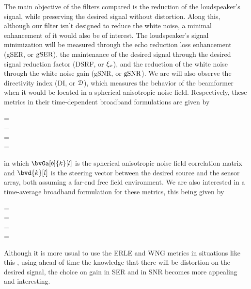 The main objective of the filters compared is the reduction of the loudspeaker's signal, while preserving the desired signal without distortion. Along this, although our filter isn't designed to reduce the white noise, a minimal enhancement of it would also be of interest. The loudspeaker's signal minimization will be measured through the echo reduction loss enhancement (gSER, or $\text{gSER}$), the maintenance of the desired signal through the desired signal reduction factor (DSRF, or $\xi_{x}$), and the reduction of the white noise through the white noise gain (gSNR, or $\text{gSNR}$). We are will also observe the directivity index (DI, or $\mathcal{D}$), which measures the behavior of the beamformer when it would be located in a spherical anisotropic noise field. Respectively, these metrics in their time-dependent broadband formulations are given by
\begin{subgather}
	\dsrf[l] =  \\
	\gser[l] =  \cdot {}\\
	\gsnr[l] =  \cdot {} \\
	\di[l] = 
\end{subgather}
in which $\bvGa[b]{k}[l]$ is the spherical anisotropic noise field correlation matrix \cite{habets_generating_2007} and $\bvd{k}[l]$ is the steering vector between the desired source and the sensor array, both assuming a far-end free field environment. We are also interested in a time-average broadband formulation for these metrics, this being given by
\begin{subgather}
	\dsrf =  \\
	\gser =  \cdot {} \\
	\gsnr =  \cdot {} \\
	\di = 
\end{subgather}

Although it is more usual to use the ERLE and WNG metrics in situations like this \cite{??1,??2}, using ahead of time the knowledge that there will be distortion on the desired signal, the choice on gain in SER and in SNR becomes more appealing and interesting.

